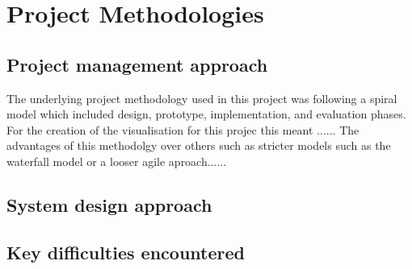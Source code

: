 
\chapter{Project Methodologies}\label{C:m}

\section{Project management approach}
The underlying project methodology used in this project was following a spiral model which included design, prototype, implementation, and evaluation phases. For the creation of the visualisation for this projec this meant ...... The advantages of this methodolgy over others such as stricter models such as the waterfall model or a looser agile aproach......

\section{System design approach}


\section{Key difficulties encountered}
